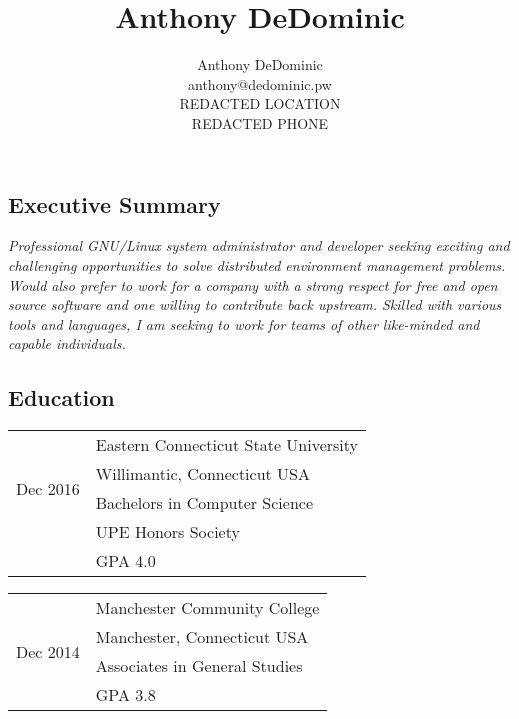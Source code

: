 \documentclass[10pt,letterpaper,]{article}
\author{Anthony DeDominic\\anthony@dedominic.pw\\REDACTED LOCATION\\REDACTED PHONE}
\title{Anthony DeDominic}
\begin{document}

\subsection{Executive Summary}\label{about}

\emph{Professional GNU/Linux system administrator and developer seeking
exciting and challenging opportunities to solve distributed environment
management problems. Would also prefer to work for a company with
a strong respect for free and open source software and one willing to
contribute back upstream. Skilled with various tools and languages, 
I am seeking to work for teams of other like-minded and capable individuals.}

\subsection{Education}\label{education}

\begin{table}[!h]
    \begin{minipage}{0.5\linewidth}
    \centering
    \begin{tabular}{l|l}
        \multirow{4}{*}{Dec 2016}
        & Eastern Connecticut State University \\
        & Willimantic, Connecticut USA \\
        & Bachelors in Computer Science \\
        & UPE Honors Society \\
        & GPA 4.0 \\
    \end{tabular}
    \end{minipage}
    \begin{minipage}{0.5\linewidth}
    \centering
    \begin{tabular}{l|l}
        \multirow{4}{*}{Dec 2014} 
        & Manchester Community College \\
        & Manchester, Connecticut USA \\
        & Associates in General Studies \\
        & GPA 3.8 \\
    \end{tabular}
    \end{minipage}
\end{table}
\end{document}
